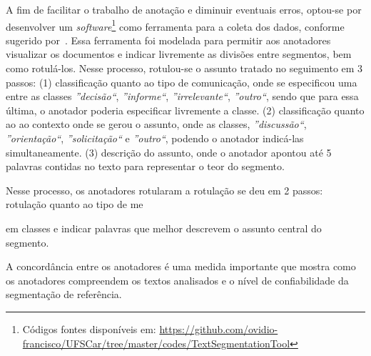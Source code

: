 A fim de facilitar o trabalho de anotação e diminuir eventuais erros, optou-se por desenvolver um \textit{software}\footnote{Códigos fontes disponíveis em: \url{https://github.com/ovidio-francisco/UFSCar/tree/master/codes/TextSegmentationTool} } como ferramenta para a coleta dos dados, conforme sugerido por~\cite{Hovy2010}. Essa ferramenta foi modelada para permitir aos anotadores visualizar os documentos e indicar livremente as divisões entre segmentos, bem como rotulá-los. 
Nesse processo, rotulou-se o assunto tratado no seguimento em 3 passos:
(1) classificação quanto ao tipo de comunicação, onde se especificou uma entre as classes 
\textit{''decisão``},
\textit{''informe``},
\textit{''irrelevante``},
\textit{''outro``}, sendo que para essa última, o anotador poderia especificar livremente a classe.
(2) classificação quanto ao ao contexto onde se gerou o assunto, onde as classes, 
\textit{''discussão``},
\textit{''orientação``},
\textit{''solicitação``} e
\textit{''outro``}, podendo o anotador indicá-las simultaneamente.
(3) descrição do assunto, onde o anotador apontou até 5 palavras contidas no texto para representar o teor do segmento.


Nesse processo, os anotadores rotularam
a rotulação se deu em 2 passos: rotulação quanto ao tipo de me

em classes e indicar palavras que melhor descrevem o assunto central do segmento.













A concordância entre os anotadores é uma medida importante que mostra como os anotadores compreendem os textos analisados e o nível de confiabilidade da segmentação de referência.







